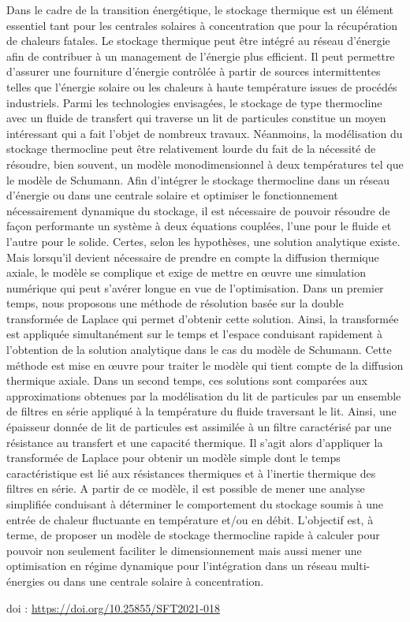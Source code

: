 {\normalsize
Dans le cadre de la transition énergétique, le stockage thermique est un élément essentiel tant pour les centrales solaires à concentration que pour la récupération de chaleurs fatales. Le stockage thermique peut être intégré au réseau d'énergie afin de contribuer à un management de l'énergie plus efficient. Il peut permettre d'assurer une fourniture d'énergie contrôlée à partir de sources intermittentes telles que l'énergie solaire ou les chaleurs à haute température issues de procédés industriels. Parmi les technologies envisagées, le stockage de type thermocline avec un fluide de transfert qui traverse un lit de particules constitue un moyen intéressant qui a fait l'objet de nombreux travaux. Néanmoins, la modélisation du stockage thermocline peut être relativement lourde du fait de la nécessité de résoudre, bien souvent, un modèle monodimensionnel à deux températures tel que le modèle de Schumann. Afin d'intégrer le stockage thermocline dans un réseau d'énergie ou dans une centrale solaire et optimiser le fonctionnement nécessairement dynamique du stockage, il est nécessaire de pouvoir résoudre de façon performante un système à deux équations couplées, l'une pour le fluide et l'autre pour le solide. Certes, selon les hypothèses, une solution analytique existe. Mais lorsqu'il devient nécessaire de prendre en compte la diffusion thermique axiale, le modèle se complique et exige de mettre en œuvre une simulation numérique qui peut s'avérer longue en vue de l'optimisation. Dans un premier temps, nous proposons une méthode de résolution basée sur la double transformée de Laplace qui permet d'obtenir cette solution. Ainsi, la transformée est appliquée simultanément sur le temps et l'espace conduisant rapidement à l'obtention de la solution analytique dans le cas du modèle de Schumann. Cette méthode est mise en œuvre pour traiter le modèle qui tient compte de la diffusion thermique axiale. Dans un second temps, ces solutions sont comparées aux approximations obtenues par la modélisation du lit de particules par un ensemble de filtres en série appliqué à la température du fluide traversant le lit. Ainsi, une épaisseur donnée de lit de particules est assimilée à un filtre caractérisé par une résistance au transfert et une capacité thermique. Il s'agit alors d'appliquer la transformée de Laplace pour obtenir un modèle simple dont le temps caractéristique est lié aux résistances thermiques et à l'inertie thermique des filtres en série. A partir de ce modèle, il est possible de mener une analyse simplifiée conduisant à déterminer le comportement du stockage soumis à une entrée de chaleur fluctuante en température et/ou en débit. L'objectif est, à terme, de proposer un modèle de stockage thermocline rapide à calculer pour pouvoir non seulement faciliter le dimensionnement mais aussi mener une optimisation en régime dynamique pour l'intégration dans un réseau multi-énergies ou dans une centrale solaire à concentration.

 \vfill doi : \url{https://doi.org/10.25855/SFT2021-018}

}
 
